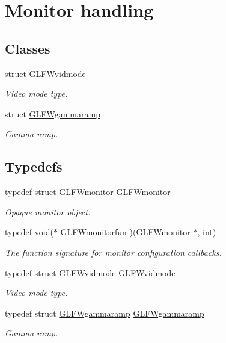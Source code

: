 \hypertarget{group__monitor}{\section{Monitor handling}
\label{group__monitor}
}
\subsection*{Classes}
\begin{DoxyCompactItemize}
\item 
struct \hyperlink{struct_g_l_f_wvidmode}{G\-L\-F\-Wvidmode}
\begin{DoxyCompactList}\small\item\em Video mode type. \end{DoxyCompactList}\item 
struct \hyperlink{struct_g_l_f_wgammaramp}{G\-L\-F\-Wgammaramp}
\begin{DoxyCompactList}\small\item\em Gamma ramp. \end{DoxyCompactList}\end{DoxyCompactItemize}
\subsection*{Typedefs}
\begin{DoxyCompactItemize}
\item 
typedef struct \hyperlink{group__monitor_ga8d9efd1cde9426692c73fe40437d0ae3}{G\-L\-F\-Wmonitor} \hyperlink{group__monitor_ga8d9efd1cde9426692c73fe40437d0ae3}{G\-L\-F\-Wmonitor}
\begin{DoxyCompactList}\small\item\em Opaque monitor object. \end{DoxyCompactList}\item 
typedef \hyperlink{wglew_8h_aeea6e3dfae3acf232096f57d2d57f084}{void}($\ast$ \hyperlink{group__monitor_ga67b74af6cecfdbccc7e57a6319a57210}{G\-L\-F\-Wmonitorfun} )(\hyperlink{group__monitor_ga8d9efd1cde9426692c73fe40437d0ae3}{G\-L\-F\-Wmonitor} $\ast$, \hyperlink{wglew_8h_a500a82aecba06f4550f6849b8099ca21}{int})
\begin{DoxyCompactList}\small\item\em The function signature for monitor configuration callbacks. \end{DoxyCompactList}\item 
typedef struct \hyperlink{struct_g_l_f_wvidmode}{G\-L\-F\-Wvidmode} \hyperlink{group__monitor_gae48aadf4ea0967e6605c8f58fa5daccb}{G\-L\-F\-Wvidmode}
\begin{DoxyCompactList}\small\item\em Video mode type. \end{DoxyCompactList}\item 
typedef struct \hyperlink{struct_g_l_f_wgammaramp}{G\-L\-F\-Wgammaramp} \hyperlink{group__monitor_gaec0bd37af673be8813592849f13e02f0}{G\-L\-F\-Wgammaramp}
\begin{DoxyCompactList}\small\item\em Gamma ramp. \end{DoxyCompactList}\end{DoxyCompactItemize}
